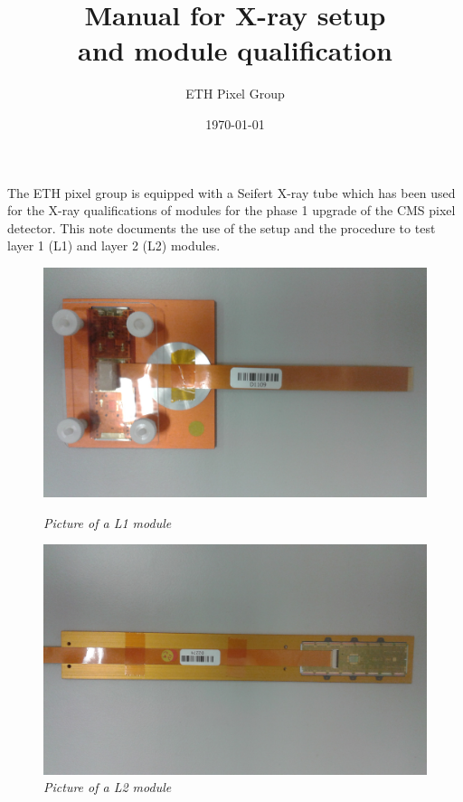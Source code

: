 \documentclass[a4paper,12pt,twoside]{article}
\date{}
\begin{document}
\title{\textbf{Manual for X-ray setup \\ and module qualification}}
\date{\today}
\author{ETH Pixel Group}
\maketitle

The ETH pixel group is equipped with a Seifert X-ray tube which has been used for the X-ray qualifications of modules for the phase 1 upgrade of the CMS pixel detector. This note documents the use of the setup and the procedure to test layer 1 (L1) and layer 2 (L2) modules.

\begin{figure} [h!]
\centering
\begin{minipage}{.49\textwidth}
  \centering
  \includegraphics[width=\textwidth]{./L1.jpg}
  \caption{\em Picture of a L1 module}
  \label{L1}
\end{minipage}%
\hspace{1mm}
\begin{minipage}{.49\textwidth}
  \centering
  \includegraphics[width=\textwidth]{./L2.jpg}
  \caption{\em Picture of a L2 module}
  \label{L2}
\end{minipage}
\end{figure}
\end{document}
